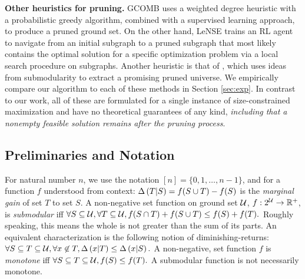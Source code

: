 \textbf{Other heuristics for pruning.}
GCOMB \citep{Manchanda2020a}
uses a weighted degree heuristic
with a probabilistic greedy algorithm,
combined with a supervised learning approach, to produce a pruned
ground set. On the other hand, LeNSE \citep{Ireland2022} trains an RL agent to navigate from an initial subgraph to a pruned subgraph that most likely contains the optimal solution for a specific optimization problem via a local search procedure on subgraphs.
Another heuristic is that of \citet{Zhou2017}, which uses ideas from submodularity
to extract a promising pruned universe. We empirically compare our algorithm
to each of these methods in Section \ref{sec:exp}. In contrast to our work,
all of these are formulated
for a single instance of size-constrained maximization and have no theoretical
guarantees of any kind, \textit{including that a nonempty feasible solution remains after the
pruning process}. 


\subsection{Preliminaries and Notation} \label{sec:prelim}
For natural number $n$, we use the notation $[n] = \{0, 1, \ldots, n-1 \}$,
and for a function $f$ understood from context: $\Delta \left( T | S \right) = f( S \cup T ) - f(S)$
is the \textit{marginal gain} of set $T$ to set $S$. 
A non-negative set function on ground set $\mathcal{U}$, $f : 2^{\mathcal{U}} \to \mathbb R^+$,
is \textit{submodular} iff
$\forall S \subseteq \mathcal{U}, \forall T \subseteq \mathcal{U}, f( S \cap T ) + f( S \cup T ) \le f(S) + f(T).$
Roughly speaking, this means the whole is not greater than the sum of its parts.
An equivalent characterization is the following notion of diminishing-returns:
$ \forall S \subseteq T \subseteq \mathcal{U}, \forall x \not \in T, \Delta \left( x | T \right) \le \Delta \left( x | S \right).$
A non-negative, set function $f$ 
is \textit{monotone} iff
$\forall S \subseteq T \subseteq \mathcal{U}, f( S ) \le f( T ).$
A submodular function is not necessarily monotone.

